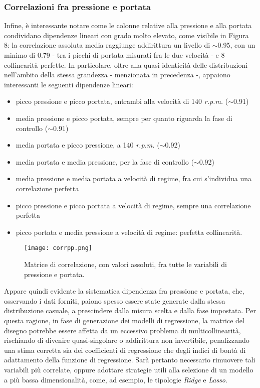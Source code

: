 \documentclass[fleqn,10pt]{SelfArx} %
\begin{document}
\subsubsection{Correlazioni fra pressione e portata}\label{boh}
Infine, è interessante notare come le colonne relative alla pressione e alla portata condividano dipendenze lineari con grado molto elevato, come visibile in Figura 8: la correlazione assoluta media raggiunge addirittura un livello di $\sim$0.95, con un minimo di 0.79 - tra i picchi di portata misurati fra le due velocità - e 8 collinearità perfette. In particolare, oltre alla quasi identicità delle distribuzioni nell'ambito della stessa grandezza - menzionata in precedenza -, appaiono interessanti le seguenti dipendenze lineari:
\begin{itemize}
    \item picco pressione e picco portata, entrambi alla velocità di 140 \textit{r.p.m.} ($\sim$0.91)
    \item media pressione e picco portata, sempre per quanto riguarda la fase di controllo ($\sim$0.91)
    \item media portata e picco pressione, a 140 \textit{r.p.m.} ($\sim$0.92)
    \item media portata e media pressione, per la fase di controllo ($\sim$0.92)
    \item media pressione e media portata a velocità di regime, fra cui s'individua una correlazione perfetta
    \item picco pressione e picco portata a velocità di regime, sempre una correlazione perfetta
    \item picco portata e media pressione a velocità di regime: perfetta collinearità.
\end{itemize}
\begin{figure}[H]
    \centering
    \texttt{[image: corrpp.png]}
    \label{fig:em}
    \caption{Matrice di correlazione, con valori assoluti, fra tutte le variabili di pressione e portata.}
\end{figure}
Appare quindi evidente la sistematica dipendenza fra pressione e portata, che, osservando i dati forniti, paiono spesso essere state generate dalla stessa distribuzione casuale, a prescindere dalla misura scelta e dalla fase impostata. Per questa ragione, in fase di generazione dei modelli di regressione, la matrice del disegno potrebbe essere affetta da un eccessivo problema di multicollinearità, rischiando di divenire quasi-singolare o addirittura non invertibile, penalizzando una stima corretta sia dei coefficienti di regressione che degli indici di bontà di adattamento della funzione di regressione. Sarà pertanto necessario rimuovere tali variabili più correlate, oppure adottare strategie utili alla selezione di un modello a più bassa dimensionalità, come, ad esempio, le tipologie \textit{Ridge} e \textit{Lasso}.
\end{document}
